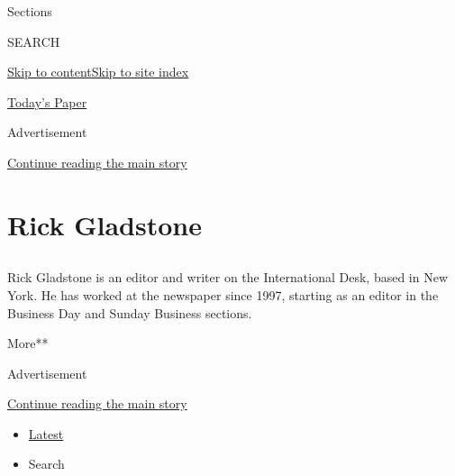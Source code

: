 Sections

SEARCH

\protect\hyperlink{site-content}{Skip to
content}\protect\hyperlink{site-index}{Skip to site index}

\href{https://myaccount.nytimes3xbfgragh.onion/auth/login?response_type=cookie\&client_id=vi}{}

\href{https://www.nytimes3xbfgragh.onion/section/todayspaper}{Today's
Paper}

Advertisement

\protect\hyperlink{after-top}{Continue reading the main story}

\hypertarget{rick-gladstone}{%
\section{Rick Gladstone}\label{rick-gladstone}}

\subsection{}

Rick Gladstone is an editor and writer on the International Desk, based
in New York. He has worked at the newspaper since 1997, starting as an
editor in the Business Day and Sunday Business sections.

More**

Advertisement

\protect\hyperlink{after-mid1}{Continue reading the main story}

\begin{itemize}
\tightlist
\item
  \protect\hyperlink{stream-panel}{Latest}
\item
  Search
\end{itemize}

